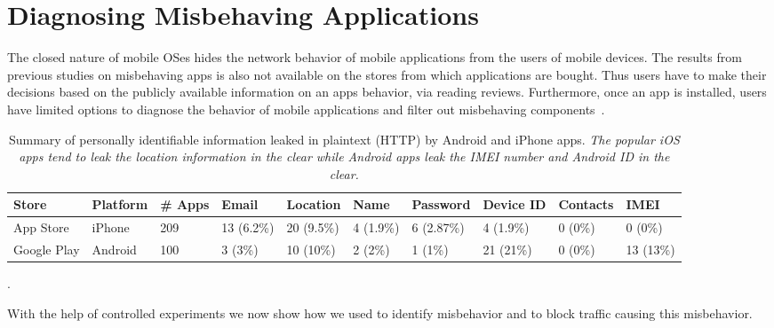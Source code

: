 \section{Diagnosing Misbehaving Applications}
\label{sec:diagnose-apps}

The closed nature of mobile OSes hides the network behavior of mobile applications from the users of mobile devices. 
The results from previous studies on misbehaving apps is also not available on the stores from which applications are bought.
Thus users have to make their decisions based on the publicly available information on an apps behavior, \eg via reading reviews.
Furthermore, once an app is installed, users have limited options to diagnose the behavior of mobile applications and filter out misbehaving components~\cite{hornyack:appfence}. 

\begin{table*}[t]
    \centering
    \begin{small}
    \begin{tabular}{|l|l|l|l|l|l|l|l|l|l|}
       \hline
       {\bf Store}&{\bf Platform}&{\bf \# Apps}&{\bf Email}& {\bf Location}& {\bf Name} &{\bf Password}& {\bf Device ID}& {\bf Contacts}& {\bf IMEI}\\
       \hline
       App Store&iPhone&209&13 (6.2\%) &20 (9.5\%)&4 (1.9\%)&6 (2.87\%)&4 (1.9\%)&0 (0\%)&0 (0\%)\\
       \hline
       Google Play&Android&100&3 (3\%)&10 (10\%)&2 (2\%)&1 (1\%)&21 (21\%)&0 (0\%)&13 (13\%)\\
       \hline
    \end{tabular}
    \end{small}
    \caption{Summary of personally identifiable information leaked in plaintext (HTTP) by Android and iPhone apps. \emph{The popular iOS apps tend to leak the location information in the clear while Android apps leak the IMEI number and Android ID in the clear.}}
    \label{tab:pii}
\end{table*}

. 

With the help of controlled experiments we now show how we used \meddle to identify misbehavior and to block traffic causing this misbehavior. 



